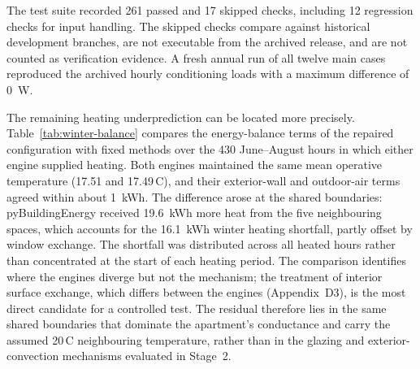 The test suite recorded 261 passed and 17 skipped checks, including 12
regression checks for input handling. The skipped checks compare against
historical development branches, are not executable from the archived
release, and are not counted as verification evidence. A fresh annual run of
all twelve main cases reproduced the archived hourly conditioning loads with a
maximum difference of 0~W.





The remaining heating underprediction can be located more precisely.
Table~\ref{tab:winter-balance} compares the energy-balance terms of the repaired
configuration with fixed methods over the 430 June--August hours in which either
engine supplied heating. Both engines maintained the same mean operative
temperature (17.51 and 17.49\,\textdegree C), and their exterior-wall and
outdoor-air terms agreed within about 1~kWh. The difference arose at the shared
boundaries: pyBuildingEnergy received 19.6~kWh more heat from the five
neighbouring spaces, which accounts for the 16.1~kWh winter heating shortfall,
partly offset by window exchange. The shortfall was distributed across all
heated hours rather than concentrated at the start of each heating period. The
comparison identifies where the engines diverge but not the mechanism; the
treatment of interior surface exchange, which differs between the engines
(Appendix~D3), is the most direct candidate for a controlled test. The
residual therefore lies in the same shared boundaries that dominate the
apartment's conductance and carry the assumed 20\,\textdegree C neighbouring
temperature, rather than in the glazing and exterior-convection mechanisms
evaluated in Stage~2.

